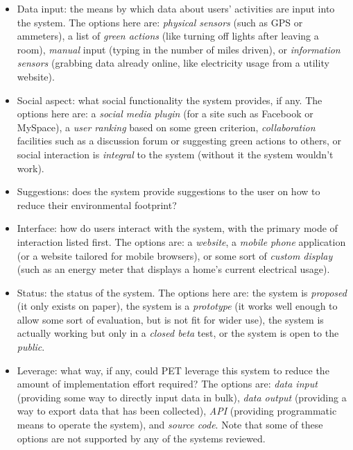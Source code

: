 \begin{itemize}
	\item Data input: the means by which data about users' activities are input into the system. The options here are: \emph{physical sensors} (such as GPS or ammeters), a list of \emph{green actions} (like turning off lights after leaving a room), \emph{manual} input (typing in the number of miles driven), or \emph{information sensors} (grabbing data already online, like electricity usage from a utility website).
	\item Social aspect: what social functionality the system provides, if any.  The options here are: a \emph{social media plugin} (for a site such as Facebook or MySpace), a \emph{user ranking} based on some green criterion, \emph{collaboration} facilities such as a discussion forum or suggesting green actions to others, or social interaction is \emph{integral} to the system (without it the system wouldn't work).
	\item Suggestions: does the system provide suggestions to the user on how to reduce their environmental footprint?
	\item Interface: how do users interact with the system, with the primary mode of interaction listed first. The options are: a \emph{website}, a \emph{mobile phone} application (or a website tailored for mobile browsers), or some sort of \emph{custom display} (such as an energy meter that displays a home's current electrical usage).
	\item Status: the status of the system. The options here are: the system is \emph{proposed} (it only exists on paper), the system is a \emph{prototype} (it works well enough to allow some sort of evaluation, but is not fit for wider use), the system is actually working but only in a \emph{closed beta} test, or the system is open to the \emph{public}.
	\item Leverage: what way, if any, could PET leverage this system to reduce the amount of implementation effort required? The options are: \emph{data input} (providing some way to directly input data in bulk), \emph{data output} (providing a way to export data that has been collected), \emph{API} (providing programmatic means to operate the system), and \emph{source code}. Note that some of these options are not supported by any of the systems reviewed.
\end{itemize}

